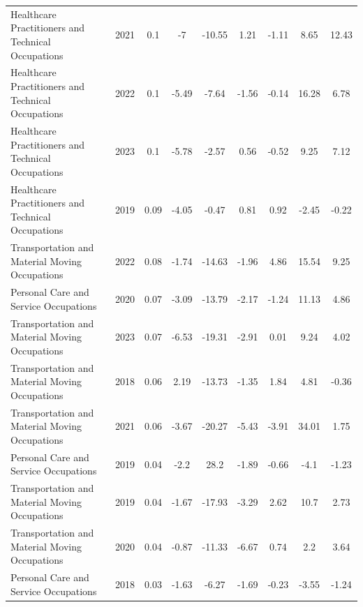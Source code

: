 \begin{table}[htbp]
\begin{tabular}{lcccccccc}
Healthcare Practitioners and Technical Occupations & 2021 & 0.1 & -7 & -10.55 & 1.21 & -1.11 & 8.65 & 12.43 \\
Healthcare Practitioners and Technical Occupations & 2022 & 0.1 & -5.49 & -7.64 & -1.56 & -0.14 & 16.28 & 6.78 \\
Healthcare Practitioners and Technical Occupations & 2023 & 0.1 & -5.78 & -2.57 & 0.56 & -0.52 & 9.25 & 7.12 \\
Healthcare Practitioners and Technical Occupations & 2019 & 0.09 & -4.05 & -0.47 & 0.81 & 0.92 & -2.45 & -0.22 \\
Transportation and Material Moving Occupations & 2022 & 0.08 & -1.74 & -14.63 & -1.96 & 4.86 & 15.54 & 9.25 \\
Personal Care and Service Occupations & 2020 & 0.07 & -3.09 & -13.79 & -2.17 & -1.24 & 11.13 & 4.86 \\
Transportation and Material Moving Occupations & 2023 & 0.07 & -6.53 & -19.31 & -2.91 & 0.01 & 9.24 & 4.02 \\
Transportation and Material Moving Occupations & 2018 & 0.06 & 2.19 & -13.73 & -1.35 & 1.84 & 4.81 & -0.36 \\
Transportation and Material Moving Occupations & 2021 & 0.06 & -3.67 & -20.27 & -5.43 & -3.91 & 34.01 & 1.75 \\
Personal Care and Service Occupations & 2019 & 0.04 & -2.2 & 28.2 & -1.89 & -0.66 & -4.1 & -1.23 \\
Transportation and Material Moving Occupations & 2019 & 0.04 & -1.67 & -17.93 & -3.29 & 2.62 & 10.7 & 2.73 \\
Transportation and Material Moving Occupations & 2020 & 0.04 & -0.87 & -11.33 & -6.67 & 0.74 & 2.2 & 3.64 \\
Personal Care and Service Occupations & 2018 & 0.03 & -1.63 & -6.27 & -1.69 & -0.23 & -3.55 & -1.24 \\
\hline\hline
\end{tabular}
\end{table}
